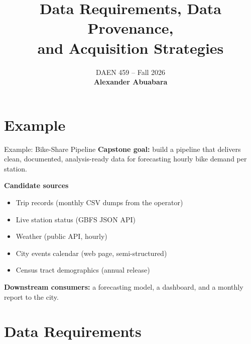 \documentclass[aspectratio=43,11pt]{beamer}
\title{
    Data Requirements, Data Provenance,\\
    and Acquisition Strategies
}
\author{}
\date{
    \textcolor{aggiemaroon}{
        DAEN 459 -- Fall 2026\\
        \textbf{Alexander Abuabara}
    }
}
\begin{document}
\begin{frame}
  \titlepage
\end{frame}


\section{Example}

\begin{frame}{Example: Bike-Share Pipeline}
  \textbf{Capstone goal:} build a pipeline that delivers clean, documented,
  analysis-ready data for forecasting hourly bike demand per station.

  \medskip
  \textbf{Candidate sources}
  \begin{itemize}
    \item Trip records (monthly CSV dumps from the operator)
    \item Live station status (GBFS JSON API)
    \item Weather (public API, hourly)
    \item City events calendar (web page, semi-structured)
    \item Census tract demographics (annual release)
  \end{itemize}

  \medskip
  \textbf{Downstream consumers:} a forecasting model, a dashboard, and a
  monthly report to the city.
\end{frame}

\section{Data Requirements}
\end{document}

